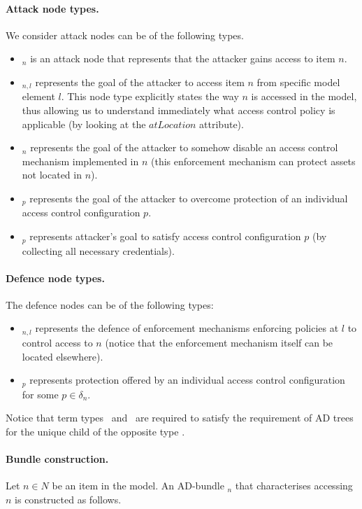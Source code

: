 \documentclass{llncs}
\begin{document}
\paragraph{Attack node types.}
We consider attack nodes can be of the following types. 
\begin{itemize}
\item \taccess$_n$ is an attack node that represents that the attacker gains access to item $n$. 
\item \taccfrom$_{n,l}$ represents the goal of the attacker to access item $n$ from specific model element $l$. This node type explicitly states the way $n$ is accessed in the model, thus allowing us to understand immediately what access control policy is applicable (by looking at the $atLocation$ attribute). 
\item \tbreak$_n$ represents the goal of the attacker to somehow disable an access control mechanism implemented in $n$ (this enforcement mechanism can protect assets not located in $n$).
\item \tbreakpol$_p$ represents the goal of the attacker to overcome protection of an individual access control configuration $p$.
\item \tsatpol$_p$ represents attacker's goal to satisfy access control configuration $p$ (by collecting all necessary credentials).

\end{itemize}



\paragraph{Defence node types.}
The defence nodes can be of the following types:
\begin{itemize}
\item \tdefence$_{n,l}$ represents the defence of enforcement mechanisms enforcing policies at $l$ to control access to $n$ (notice that the enforcement mechanism itself can be located elsewhere).
\item  \tdefpolicy$_p$ represents protection offered by an individual access control configuration for some $p \in \delta_{n}$. 
\end{itemize}
Notice that term types \tbreakpol\ and \tdefpolicy\ are required to satisfy the requirement of AD trees for the unique child of the opposite type \cite{Kordy-JLC-2014}. 

\paragraph{Bundle construction.}
Let $n \in N$ be an item in the model. An AD-bundle \baccess$_n$ that characterises accessing $n$ is constructed as follows.
\end{document}
